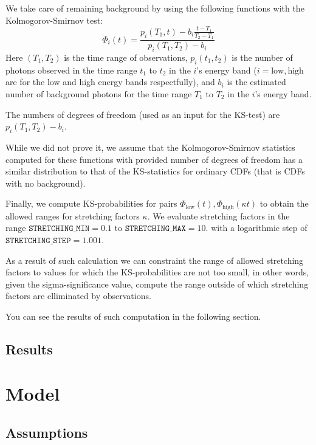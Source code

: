 \documentclass{article}
\begin{document}
We take care of remaining background by using the following functions with the Kolmogorov-Smirnov test:
\begin{equation}
	\Phi_i\left(t\right) = \frac{p_i\left(T_1, t\right) - b_i \frac{t-T_1}{T_2-T_1}}{p_i\left(T_1, T_2\right) - b_i}
\end{equation}
Here $\left(T_1, T_2\right)$ is the time range of observations, $p_i\left(t_1, t_2\right)$ is the number of photons observed in the time range $t_1$ to $t_2$ in the $i$'s energy band ($i=\text{low},\text{high}$ are for the low and high energy bands respectfully), and $b_i$ is the estimated number of background photons for the time range $T_1$ to $T_2$ in the $i$'s energy band.

The numbers of degrees of freedom (used as an input for the KS-test) are $p_i\left(T_1, T_2\right) - b_i$.

While we did not prove it, we assume that the Kolmogorov-Smirnov statistics computed for these functions with provided number of degrees of freedom has a similar distribution to that of the KS-statistics for ordinary CDFs (that is CDFs with no background).

Finally, we compute KS-probabilities for pairs $\Phi_\text{low}\left(t\right), \Phi_\text{high}\left(\kappa t\right)$ to obtain the allowed ranges for stretching factors $\kappa$. We evaluate stretching factors in the range $\texttt{STRETCHING\_MIN} = 0.1$ to $\texttt{STRETCHING\_MAX} = 10.$ with a logarithmic step of $\texttt{STRETCHING\_STEP} = 1.001$.

As a result of such calculation we can constraint the range of allowed stretching factors to values for which the KS-probabilities are not too small, in other words, given the sigma-significance value, compute the range outside of which stretching factors are elliminated by observations.

You can see the results of such computation in the following section.

\subsection{Results}

\section{Model}

\subsection{Assumptions}
\end{document}
